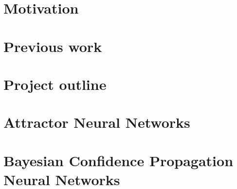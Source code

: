 \section{Motivation}
\section{Previous work}
\section{Project outline}
\section{Attractor Neural Networks}

\section{Bayesian Confidence Propagation Neural Networks}

